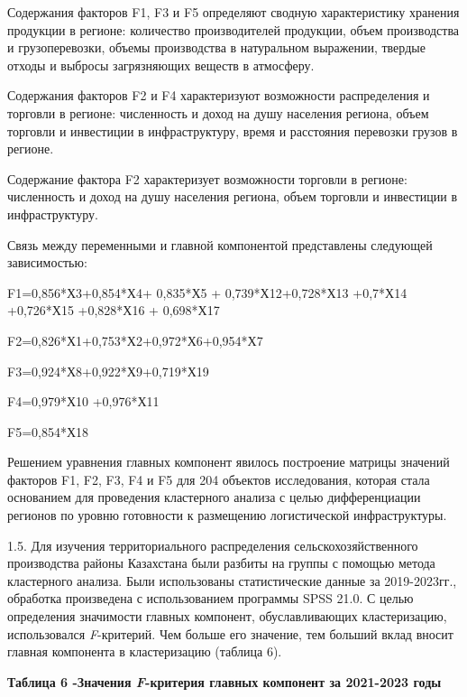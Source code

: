 Содержания факторов F1, F3 и F5 определяют сводную характеристику
хранения продукции в регионе: количество производителей продукции, объем
производства и грузоперевозки, объемы производства в натуральном
выражении, твердые отходы и выбросы загрязняющих веществ в атмосферу.

Содержания факторов F2 и F4 характеризуют возможности распределения и
торговли в регионе: численность и доход на душу населения региона, объем
торговли и инвестиции в инфраструктуру, время и расстояния перевозки
грузов в регионе.

Содержание фактора F2 характеризует возможности торговли в регионе:
численность и доход на душу населения региона, объем торговли и
инвестиции в инфраструктуру.

Связь между переменными и главной компонентой представлены следующей
зависимостью:

F1=0,856*Х3+0,854*Х4+ 0,835*Х5 + 0,739*Х12+0,728*Х13 +0,7*Х14 +0,726*Х15
+0,828*Х16 + 0,698*Х17

F2=0,826*Х1+0,753*Х2+0,972*Х6+0,954*Х7

F3=0,924*Х8+0,922*Х9+0,719*Х19

F4=0,979*Х10 +0,976*Х11

F5=0,854*Х18

Решением уравнения главных компонент явилось построение матрицы значений
факторов F1, F2, F3, F4 и F5 для 204 объектов исследования, которая
стала основанием для проведения кластерного анализа с целью
дифференциации регионов по уровню готовности к размещению логистической
инфраструктуры.

1.5. Для изучения территориального распределения сельскохозяйственного
производства районы Казахстана были разбиты на группы с помощью метода
кластерного анализа. Были использованы статистические данные за
2019-2023гг., обработка произведена с использованием программы SPSS
21.0. С целью определения значимости главных компонент, обуславливающих
кластеризацию, использовался \emph{F}-критерий. Чем больше его значение,
тем больший вклад вносит главная компонента в кластеризацию (таблица 6).

{\bfseries Таблица 6 -Значения \emph{F}-критерия главных компонент за
2021-2023 годы}

